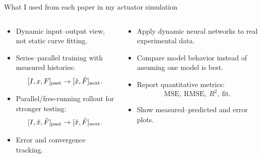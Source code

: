 \documentclass[aspectratio=169,10pt]{beamer}
\begin{document}
\begin{frame}{What I used from each paper in my actuator simulation}
\scriptsize
\setlength{\abovedisplayskip}{3pt}
\setlength{\belowdisplayskip}{3pt}

\begin{columns}[T,onlytextwidth]

\begin{column}{0.32\textwidth}
\begin{tcolorbox}[
enhanced,
colback=LightGray,
colframe=DeepBlue,
colbacktitle=DeepBlue,
coltitle=white,
title=\textbf{From Wang},
fonttitle=\small\bfseries,
boxrule=0.8pt,
arc=2mm,
left=2mm,right=2mm,top=1.5mm,bottom=1.5mm,
height=0.66\textheight
]
\begin{itemize}\itemsep3pt
\item Dynamic input--output view, not static curve fitting.
\item Series--parallel training with measured histories:
\[
[I,x,F]_{\rm past}\rightarrow[\hat x,\hat F]_{\rm next}.
\]
\item Parallel/free-running rollout for stronger testing:
\[
[I,\hat x,\hat F]_{\rm past}\rightarrow[\hat x,\hat F]_{\rm next}.
\]
\item Error and convergence tracking.
\end{itemize}
\end{tcolorbox}
\end{column}

\begin{column}{0.32\textwidth}
\begin{tcolorbox}[
enhanced,
colback=LightGray,
colframe=SoftBlue,
colbacktitle=SoftBlue,
coltitle=white,
title=\textbf{From Ogunmolu/Gans},
fonttitle=\small\bfseries,
boxrule=0.8pt,
arc=2mm,
left=2mm,right=2mm,top=1.5mm,bottom=1.5mm,
height=0.66\textheight
]
\begin{itemize}\itemsep3pt
\item Apply dynamic neural networks to real experimental data.
\item Compare model behavior instead of assuming one model is best.
\item Report quantitative metrics:
\[
\text{MSE},\ \text{RMSE},\ R^2,\ \text{fit}.
\]
\item Show measured--predicted and error plots.
\end{itemize}
\end{tcolorbox}
\end{column}


\end{columns}
\end{frame}
\end{document}
